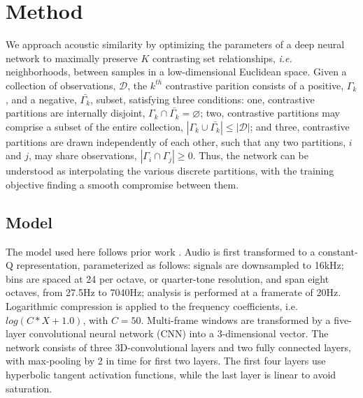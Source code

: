 \documentclass{article}
\begin{document}



\section{Method}

We approach acoustic similarity by optimizing the parameters of a deep neural network to maximally preserve $K$ contrasting set relationships, \emph{i.e.} neighborhoods, between samples in a low-dimensional Euclidean space.
Given a collection of observations, $\mathcal{D}$, the $k^{th}$ contrastive parition consists of a positive, $\Gamma_k$, and a negative, $\bar{\Gamma_k}$, subset, satisfying three conditions:
one, contrastive partitions are internally disjoint, $\Gamma_k \cap \bar{\Gamma_k} = \varnothing$;
two, contrastive partitions may comprise a subset of the entire collection, $|\Gamma_k \cup \bar{\Gamma_k}| \le |\mathcal{D}|$;
and three, contrastive partitions are drawn independently of each other, such that any two partitions, $i$ and $j$, may share observations, $|\Gamma_i \cap \Gamma_j| \ge 0$.
Thus, the network can be understood as interpolating the various discrete partitions, with the training objective finding a smooth compromise between them.


\subsection{Model}

The model used here follows prior work \cite{humphrey2015dl4mir}.
Audio is first transformed to a constant-Q representation, parameterized as follows:
signals are downsampled to 16kHz;
bins are spaced at 24 per octave, or quarter-tone resolution, and span eight octaves, from 27.5Hz to 7040Hz;
analysis is performed at a framerate of 20Hz.
Logarithmic compression is applied to the frequency coefficients, i.e. $log(C*X + 1.0)$, with $C=50$.
Multi-frame windows are transformed by a five-layer convolutional neural network (CNN) into a 3-dimensional vector.
The network consists of three 3D-convolutional layers and two fully connected layers, with max-pooling by 2 in time for first two layers.
The first four layers use hyperbolic tangent activation functions, while the last layer is linear to avoid saturation.
\end{document}

